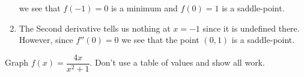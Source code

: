 \documentclass{hwset}
\begin{document}
\begin{enumerate}
\begin{solution}
\begin{center}
	\end{center}
		we see that $f(-1) = 0$ is a minimum and $f(0) = 1$ is a saddle-point.
	\end{solution}
	\item \begin{solution}
		The Second derivative tells us nothing at $x=-1$ since it is undefined
		there. However, since $f''(0)=0$ we see that the point $(0,1)$ is a saddle-point.
	\end{solution}
\end{enumerate}

\begin{problem}[4.]
	Graph $f(x) = \dfrac{4x}{x^2 + 1}$. Don't use a table of values and show all
	work.
\end{problem}
\end{document}
